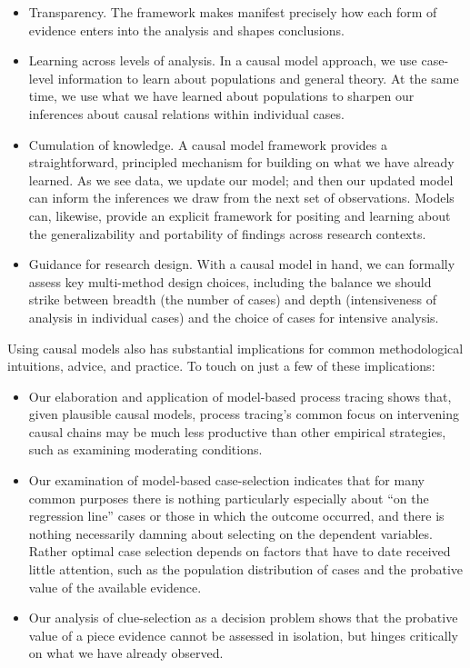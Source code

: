 \documentclass[
  12pt,
]{book}
\providecommand{\tightlist}{%
  \setlength{\itemsep}{0pt}\setlength{\parskip}{0pt}}
\begin{document}
\begin{itemize}
\tightlist
\item
  Transparency. The framework makes manifest precisely how each form of evidence enters into the analysis and shapes conclusions.
\end{itemize}

\begin{itemize}
\item
  Learning across levels of analysis. In a causal model approach, we use case-level information to learn about populations and general theory. At the same time, we use what we have learned about populations to sharpen our inferences about causal relations within individual cases.
\item
  Cumulation of knowledge. A causal model framework provides a straightforward, principled mechanism for building on what we have already learned. As we see data, we update our model; and then our updated model can inform the inferences we draw from the next set of observations. Models can, likewise, provide an explicit framework for positing and learning about the generalizability and portability of findings across research contexts.
\item
  Guidance for research design. With a causal model in hand, we can formally assess key multi-method design choices, including the balance we should strike between breadth (the number of cases) and depth (intensiveness of analysis in individual cases) and the choice of cases for intensive analysis.
\end{itemize}

Using causal models also has substantial implications for common methodological intuitions, advice, and practice. To touch on just a few of these implications:

\begin{itemize}
\item
  Our elaboration and application of model-based process tracing shows that, given plausible causal models, process tracing's common focus on intervening causal chains may be much less productive than other empirical strategies, such as examining moderating conditions.
\item
  Our examination of model-based case-selection indicates that for many common purposes there is nothing particularly especially about ``on the regression line'' cases or those in which the outcome occurred, and there is nothing necessarily damning about selecting on the dependent variables. Rather optimal case selection depends on factors that have to date received little attention, such as the population distribution of cases and the probative value of the available evidence.
\item
  Our analysis of clue-selection as a decision problem shows that the probative value of a piece evidence cannot be assessed in isolation, but hinges critically on what we have already observed.
\end{itemize}
\end{document}
